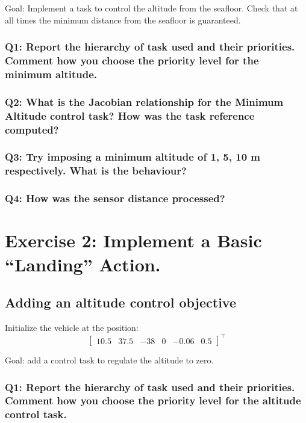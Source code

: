 \documentclass{article}
\begin{document}
Goal: Implement a task to control the altitude from the seafloor. Check that at all times the minimum distance from the seafloor is guaranteed.


\subsubsection{Q1: Report the hierarchy of task used and their priorities. Comment how you choose the priority level for the minimum altitude.}

\subsubsection{Q2: What is the Jacobian relationship for the Minimum Altitude control task? How was the task reference computed?}

\subsubsection{Q3: Try imposing a minimum altitude of 1, 5, 10 m respectively. What is the behaviour?}

\subsubsection{Q4: How was the sensor distance processed?}

\clearpage

\section{Exercise 2: Implement a Basic “Landing” Action.}
\subsection{Adding an altitude control objective}
Initialize the vehicle at the position:
\begin{displaymath}
\begin{bmatrix} 10.5 & 37.5 & -38 & 0 & -0.06 & 0.5 \end{bmatrix}^\top
\end{displaymath} 

Goal: add a control task to regulate the altitude to zero.

\subsubsection{Q1: Report the hierarchy of task used and their priorities. Comment how you choose the priority level for the altitude control task.}
\end{document}
